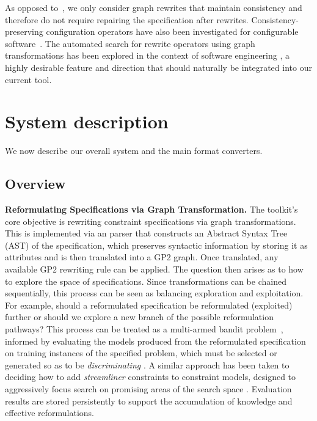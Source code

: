 \documentclass[runningheads]{llncs}
\begin{document}


As opposed to~\cite{Burdusel2021:automatic}, we only consider graph rewrites that maintain consistency and therefore do not require repairing the specification after rewrites.
Consistency-preserving configuration operators have also been investigated for configurable software~\cite{Horcas2023:break}.
The automated search for rewrite operators using graph transformations has been explored in the context of software engineering \cite{Fleck2016:search}\cite{Bill2019:local}, a highly desirable feature and direction that should naturally be integrated into our current tool.


\section{System description}

We now describe our overall system and the main format converters.

\subsection{Overview}

\noindent\textbf{Reformulating \essence Specifications via Graph Transformation.} The toolkit's core objective is rewriting \essence constraint specifications via graph transformations. This is implemented via an \essence parser that constructs an Abstract Syntax Tree (AST) of the specification, which preserves syntactic information by storing it as attributes and is then translated into a GP2 graph. Once translated, any available GP2 rewriting rule can be applied. The question then arises as to how to explore the space of \essence specifications. Since transformations can be chained sequentially, this process can be seen as balancing exploration and exploitation. For example, should a reformulated specification be reformulated (exploited) further or should we explore a new branch of the possible reformulation pathways? This process can be treated as a multi-armed bandit problem~\cite{bandits-book}, informed by evaluating the models produced from the reformulated specification on training instances of the specified problem, which must be selected or generated so as to be {\em discriminating} \cite{akgun2020discriminating,DBLP:conf/cp/0001AEMN22}. A similar approach has been taken to deciding how to add {\em streamliner} constraints to constraint models, designed to aggressively focus search on promising areas of the search space \cite{spracklen2023automated}. Evaluation results are stored persistently to support the accumulation of knowledge and effective reformulations.
\end{document}
